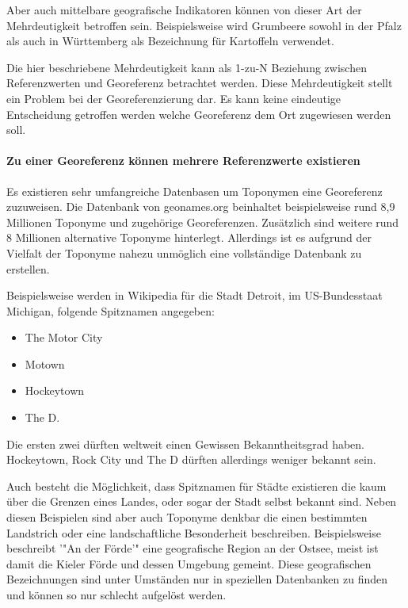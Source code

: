 							Aber auch mittelbare geografische Indikatoren können von dieser Art der Mehrdeutigkeit betroffen sein.
							Beispielsweise wird Grumbeere sowohl in der Pfalz als auch in Württemberg als Bezeichnung für Kartoffeln verwendet.

							Die hier beschriebene Mehrdeutigkeit kann als 1-zu-N Beziehung zwischen Referenzwerten und Georeferenz betrachtet werden.
							Diese Mehrdeutigkeit stellt ein Problem bei der Georeferenzierung dar.
							Es kann keine eindeutige Entscheidung getroffen werden welche Georeferenz dem Ort zugewiesen werden soll. 

						\paragraph{Zu einer Georeferenz können mehrere Referenzwerte existieren}

							Es existieren sehr umfangreiche Datenbasen um Toponymen eine Georeferenz zuzuweisen. 
							Die Datenbank von geonames.org beinhaltet beispielsweise rund 8,9 Millionen Toponyme und zugehörige Georeferenzen.
							Zusätzlich sind weitere rund 8 Millionen alternative Toponyme hinterlegt.
							Allerdings ist es aufgrund der Vielfalt der Toponyme nahezu unmöglich eine vollständige Datenbank zu erstellen.

							Beispielsweise werden in Wikipedia für die Stadt Detroit, im US-Bundesstaat Michigan, folgende Spitznamen angegeben:
							\begin{itemize}
								\item The Motor City
								\item Motown
								\item Hockeytown
								\item The D. 
							\end{itemize}

							Die ersten zwei dürften weltweit einen Gewissen Bekanntheitsgrad haben. 
							Hockeytown, Rock City und The D dürften allerdings weniger bekannt sein.  
							
							Auch besteht die Möglichkeit, dass Spitznamen für Städte existieren die kaum über die Grenzen eines Landes, oder sogar der Stadt selbst bekannt sind. 
							Neben diesen Beispielen sind aber auch Toponyme denkbar die einen bestimmten Landstrich oder eine landschaftliche Besonderheit beschreiben.
							Beispielsweise beschreibt '"An der Förde'" eine geografische Region an der Ostsee, meist ist damit die Kieler Förde und dessen Umgebung gemeint. 
							Diese geografischen Bezeichnungen sind unter Umständen nur in speziellen Datenbanken zu finden und können so nur schlecht aufgelöst werden. 

